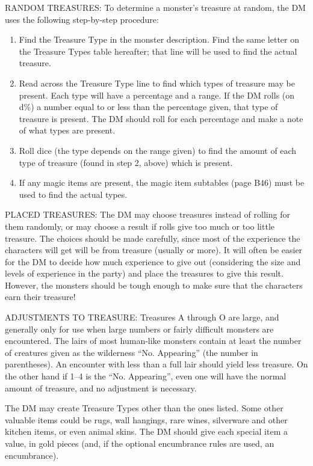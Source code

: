 \documentclass[letterpaper,serif,tightsqueeze]{rpg-module}
\newcommand{\threequarters}{{\usefont{T1}{lmr}{m}{n}\sfrac{3}{4}} }
\begin{document}
RANDOM TREASURES: To determine a monster's treasure at
random, the DM uses the following step-by-step procedure:
\begin{enumerate}
\item Find the Treasure Type in the monster description. Find the
same letter on the Treasure Types table hereafter; that
line will be used to find the actual treasure.
\item Read across the Treasure Type line to find which types of
treasure may be present. Each type will have a percentage
and a range. If the DM rolls (on d\%) a number equal to or
less than the percentage given, that type of treasure is
present. The DM should roll for each percentage and
make a note of what types are present.
\item Roll dice (the type depends on the range given) to find the
amount of each type of treasure (found in step 2, above) which is present.
\item If any magic items are present, the magic item subtables (page B46)
must be used to find the actual types.
\end{enumerate}

PLACED TREASURES: The DM may choose treasures instead of
rolling for them randomly, or may choose a result if rolls give too
much or too little treasure. The choices should be made carefully,
since most of the experience the characters will get will be from
treasure (usually \threequarters or more). It will often be easier for the DM to
decide how much experience to give out (considering the size and
levels of experience in the party) and place the treasures to give
this result. However, the monsters should be tough enough to
make sure that the characters earn their treasure!

ADJUSTMENTS TO TREASURE: Treasures A through O are
large, and generally only for use when large numbers or fairly difficult
monsters are encountered. The lairs of most human-like
monsters contain at least the number of creatures given as the
wilderness ``No. Appearing'' (the number in parentheses). An encounter
with less than a full lair should yield less treasure. On the
other hand if 1--4 is the ``No. Appearing'', even one will have the
normal amount of treasure, and no adjustment is necessary.

The DM may create Treasure Types other than the ones listed.
Some other valuable items could be rugs, wall hangings, rare
wines, silverware and other kitchen items, or even animal skins.
The DM should give each special item a value, in gold pieces (and,
if the optional encumbrance rules are used, an encumbrance).
\end{document}
